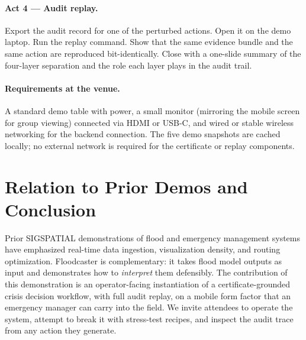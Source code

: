 \documentclass[sigconf,nonacm=true,review,authoryear]{acmart}
\begin{document}
\paragraph{Act 4 --- Audit replay.}
Export the audit record for one of the perturbed actions. Open it on
the demo laptop. Run the replay command. Show that the same evidence
bundle and the same action are reproduced bit-identically. Close
with a one-slide summary of the four-layer separation and the role
each layer plays in the audit trail.

\paragraph{Requirements at the venue.}
A standard demo table with power, a small monitor (mirroring the
mobile screen for group viewing) connected via HDMI or USB-C, and
wired or stable wireless networking for the backend connection. The
five demo snapshots are cached locally; no external network is
required for the certificate or replay components.

\section{Relation to Prior Demos and Conclusion}
\label{sec:demo-related}

Prior SIGSPATIAL demonstrations of flood and emergency management
systems have emphasized real-time data ingestion, visualization
density, and routing optimization. Floodcaster is complementary: it
takes flood model outputs as input and demonstrates how to
\emph{interpret} them defensibly. The contribution of this
demonstration is an operator-facing instantiation of a
certificate-grounded crisis decision workflow, with full audit
replay, on a mobile form factor that an emergency manager can carry
into the field. We invite attendees to operate the system, attempt
to break it with stress-test recipes, and inspect the audit trace
from any action they generate.



\end{document}

